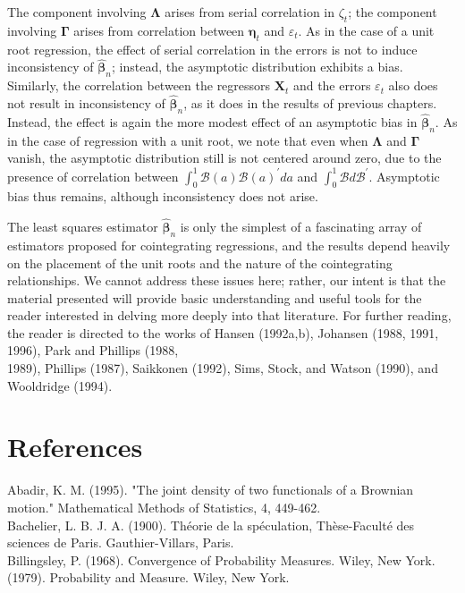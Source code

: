 \documentclass[10pt]{article}
\begin{document}
The component involving $\boldsymbol{\Lambda}$ arises from serial correlation in $\zeta_{t}$; the component involving $\boldsymbol{\Gamma}$ arises from correlation between $\boldsymbol{\eta}_{t}$ and $\varepsilon_{t}$. As in the case of a unit root regression, the effect of serial correlation in the errors is not to induce inconsistency of $\hat{\boldsymbol{\beta}}_{n}$; instead, the asymptotic distribution exhibits a bias. Similarly, the correlation between the regressors $\mathbf{X}_{t}$ and the errors $\varepsilon_{t}$ also does not result in inconsistency of $\hat{\boldsymbol{\beta}}_{n}$, as it does in the results of previous chapters. Instead, the effect is again the more modest effect of an asymptotic bias in $\hat{\boldsymbol{\beta}}_{n}$. As in the case of regression with a unit root, we note that even when $\boldsymbol{\Lambda}$ and $\boldsymbol{\Gamma}$ vanish, the asymptotic distribution still is not centered around zero, due to the presence of correlation between $\int_{0}^{1} \mathcal{B}(a) \mathcal{B}(a)^{\prime} d a$ and $\int_{0}^{1} \mathcal{B} d \mathcal{B}^{\prime}$. Asymptotic bias thus remains, although inconsistency does not arise.

The least squares estimator $\hat{\boldsymbol{\beta}}_{n}$ is only the simplest of a fascinating array of estimators proposed for cointegrating regressions, and the results depend heavily on the placement of the unit roots and the nature of the cointegrating relationships. We cannot address these issues here; rather, our intent is that the material presented will provide basic understanding and useful tools for the reader interested in delving more deeply into that literature. For further reading, the reader is directed to the works of Hansen (1992a,b), Johansen (1988, 1991, 1996), Park and Phillips (1988,\\
1989), Phillips (1987), Saikkonen (1992), Sims, Stock, and Watson (1990), and Wooldridge (1994).

\section*{References}
Abadir, K. M. (1995). "The joint density of two functionals of a Brownian motion." Mathematical Methods of Statistics, 4, 449-462.\\
Bachelier, L. B. J. A. (1900). Théorie de la spéculation, Thèse-Faculté des sciences de Paris. Gauthier-Villars, Paris.\\
Billingsley, P. (1968). Convergence of Probability Measures. Wiley, New York.\\
(1979). Probability and Measure. Wiley, New York.
\end{document}
